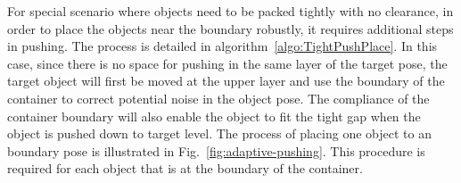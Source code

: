 For special scenario where objects need to be packed tightly with no clearance, in order to place the objects near the boundary robustly, it requires additional steps in pushing. The process is detailed in algorithm~\ref{algo:TightPushPlace}. In this case, since there is no space for pushing in the same layer of the target pose, the target object will first be moved at the upper layer and use the boundary of the container to correct potential noise in the object pose. The compliance of the container boundary will also enable the object to fit the tight gap when the object is pushed down to target level. The process of placing one object to an boundary pose is illustrated in Fig.~\ref{fig:adaptive-pushing}. This procedure is required for each object that is at the boundary of the container. 




